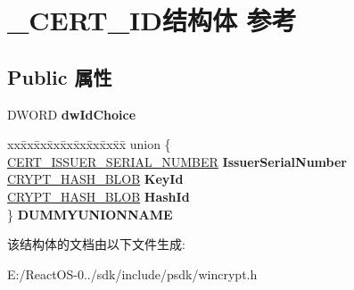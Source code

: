 \hypertarget{struct___c_e_r_t___i_d}{}\section{\+\_\+\+C\+E\+R\+T\+\_\+\+I\+D结构体 参考}
\label{struct___c_e_r_t___i_d}
\subsection*{Public 属性}
\begin{DoxyCompactItemize}
\item 
\mbox{\label{struct___c_e_r_t___i_d_ab98a0a34e5df107a0e40f74c62a1c48c}} 
D\+W\+O\+RD {\bfseries dw\+Id\+Choice}
\item 
\mbox{\label{struct___c_e_r_t___i_d_aeabe14a025206f28dede775047518bcf}} 
\begin{tabbing}
xx\=xx\=xx\=xx\=xx\=xx\=xx\=xx\=xx\=\kill
union \{\\
\>\hyperlink{struct___c_e_r_t___i_s_s_u_e_r___s_e_r_i_a_l___n_u_m_b_e_r}{CERT\_ISSUER\_SERIAL\_NUMBER} {\bfseries IssuerSerialNumber}\\
\>\hyperlink{struct___c_r_y_p_t_o_a_p_i___b_l_o_b}{CRYPT\_HASH\_BLOB} {\bfseries KeyId}\\
\>\hyperlink{struct___c_r_y_p_t_o_a_p_i___b_l_o_b}{CRYPT\_HASH\_BLOB} {\bfseries HashId}\\
\} {\bfseries DUMMYUNIONNAME}\\

\end{tabbing}\end{DoxyCompactItemize}


该结构体的文档由以下文件生成\+:\begin{DoxyCompactItemize}
\item 
E\+:/\+React\+O\+S-\/0../sdk/include/psdk/wincrypt.\+h\end{DoxyCompactItemize}
